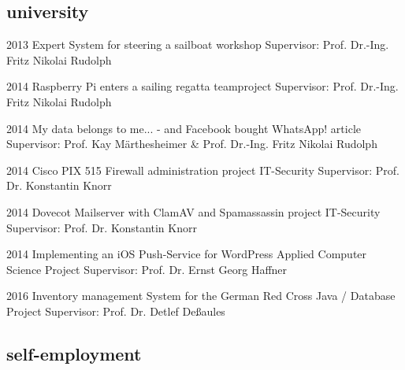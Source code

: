 \documentclass[]{friggeri-cv} %
\begin{document}
\subsection{university}

\begin{entrylist}


\entry
{2013}
{Expert System for steering a sailboat}
{workshop}
{Supervisor: Prof. Dr.-Ing. Fritz Nikolai Rudolph}


\entry
{2014}
{Raspberry Pi enters a sailing regatta}
{teamproject}
{Supervisor: Prof. Dr.-Ing. Fritz Nikolai Rudolph}


\entry
{2014}
{My data belongs to me... - and Facebook bought WhatsApp!}
{article}
{Supervisor: Prof. Kay M\"{a}rthesheimer \& Prof. Dr.-Ing. Fritz Nikolai Rudolph}


\entry
{2014}
{Cisco PIX 515 Firewall administration}
{project IT-Security}
{Supervisor: Prof. Dr. Konstantin Knorr}


\entry
{2014}
{Dovecot Mailserver with ClamAV and Spamassassin}
{project IT-Security}
{Supervisor: Prof. Dr. Konstantin Knorr}


\entry
{2014}
{Implementing an iOS Push-Service for WordPress}
{Applied Computer Science Project}
{Supervisor: Prof. Dr. Ernst Georg Haffner}


\entry
{2016}
{Inventory management System for the German Red Cross }
{Java / Database Project}
{Supervisor: Prof. Dr. Detlef Deßaules}


\end{entrylist}

\subsection{self-employment}
\end{document}
